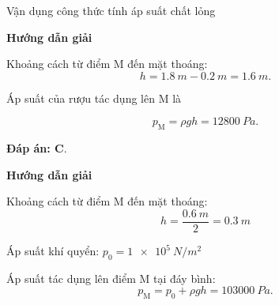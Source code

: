 \begin{dang}{Vận dụng công thức tính áp suất chất lỏng}
	{	\begin{center}
			\textbf{Hướng dẫn giải}
		\end{center}
		
		Khoảng cách từ điểm M đến mặt thoáng:
		$$h =\SI{1.8}{m} - \SI{0.2}{m} =\SI{1,6}{m}.$$
		
		Áp suất của rượu tác dụng lên M là
		
		$$ p_\text{M} = \rho g h =\SI{12800}{Pa}.$$
		
		\textbf{Đáp án: C}.
	}
	
	{	\begin{center}
			\textbf{Hướng dẫn giải}
		\end{center}
		
		Khoảng cách từ điểm M đến mặt thoáng:
		$$h =\dfrac{\SI{0.6}{m}}{2}=\SI{0.3}{m}$$
		
		Áp suất khí quyển: $p_0 = \SI{1e5}{N/m^2}$
		
		Áp suất tác dụng lên điểm M tại đáy bình:
		$$ p_\text{M} = p_0 + \rho g h =\SI{103000}{Pa}.$$
		
	}
\end{dang}

